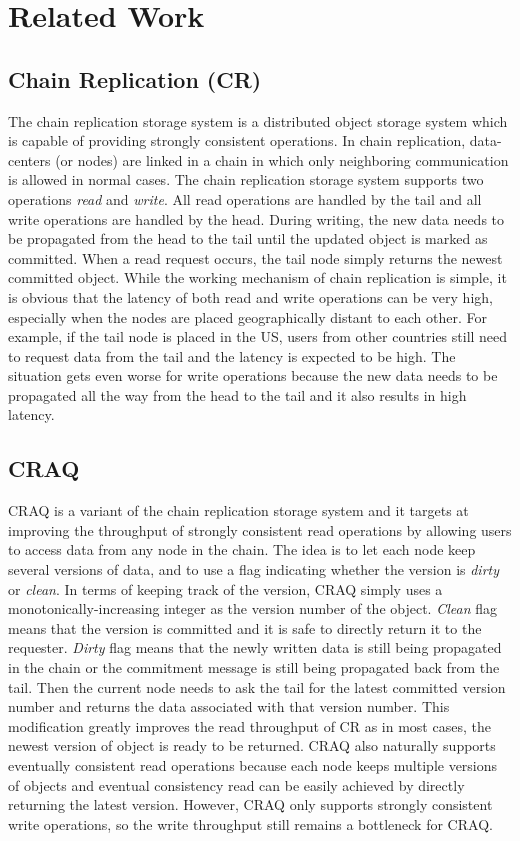 \section{Related Work}

\subsection{Chain Replication (CR)}
The chain replication storage system is a distributed object storage system which is capable of providing strongly consistent operations. In chain replication, data-centers (or nodes) are linked in a chain in which only neighboring communication is allowed in normal cases. The chain replication storage system supports two operations {\it read} and {\it write}. All read operations are handled by the tail and all write operations are handled by the head. During writing, the new data needs to be propagated from the head to the tail until the updated object is marked as committed. When a read request occurs, the tail node simply returns the newest committed object. While the working mechanism of chain replication is simple, it is obvious that the latency of both read and write operations can be very high, especially when the nodes are placed geographically distant to each other. For example, if the tail node is placed in the US, users from other countries still need to request data from the tail and the latency is expected to be high. The situation gets even worse for write operations because the new data needs to be propagated all the way from the head to the tail and it also results in high latency.

\subsection{CRAQ}
CRAQ is a variant of the chain replication storage system and it targets at improving the throughput of strongly consistent read operations by allowing users to access data from any node in the chain. The idea is to let each node keep several versions of data, and to use a flag indicating whether the version is {\it dirty} or {\it clean}. In terms of keeping track of the version, CRAQ simply uses a monotonically-increasing integer as the version number of the object. {\it Clean} flag means that the version is committed and it is safe to directly return it to the requester. {\it Dirty} flag means that the newly written data is still being propagated in the chain or the commitment message is still being propagated back from the tail. Then the current node needs to ask the tail for the latest committed version number and returns the data associated with that version number. This modification greatly improves the read throughput of CR as in most cases, the newest version of object is ready to be returned. CRAQ also naturally supports eventually consistent read operations because each node keeps multiple versions of objects and eventual consistency read can be easily achieved by directly returning the latest version. However, CRAQ only supports strongly consistent write operations, so the write throughput still remains a bottleneck for CRAQ.

